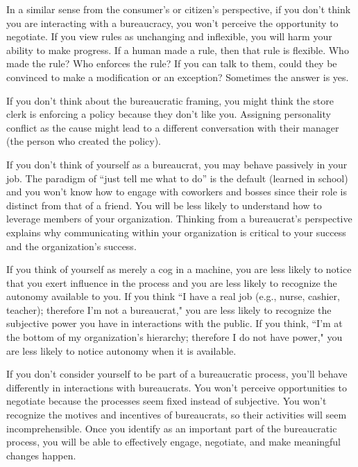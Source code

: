 In a similar sense from the consumer's or citizen's perspective, if you don't think you are interacting with a bureaucracy, you won't perceive the opportunity to negotiate.  If you view rules as unchanging and inflexible, you will harm your ability to make progress. If a human made a rule, then that rule is flexible. Who made the rule? Who enforces the rule? If you can talk to them, could they be convinced to make a modification or an exception? Sometimes the answer is yes.

If you don't think about the bureaucratic framing, you might think the store clerk is enforcing a policy because they don't like you. Assigning personality conflict as the cause might lead to a different conversation with their manager (the person who created the policy). 

If you don't think of yourself as a bureaucrat, you may behave passively in your job. The paradigm of ``just tell me what to do'' is the default (learned in school) and you won't know how to engage with coworkers and bosses since their role is distinct from that of a friend. You will be less likely to understand how to leverage members of your organization. Thinking from a bureaucrat's perspective explains why communicating within your organization is critical to your success and the organization's success. 

If you think of yourself as merely a cog in a machine, you are less likely to notice that you exert influence in the process and you are less likely to recognize the autonomy available to you. 
If you think ``I have a real job (e.g., nurse, cashier, teacher); therefore I'm not a bureaucrat," you are less likely to recognize the subjective power you have in interactions with the public.
If you think, ``I'm at the bottom of my organization's hierarchy; therefore I do not have power," you are less likely to notice autonomy when it is available.

If you don't consider yourself to be part of a bureaucratic process, you'll behave differently in interactions with bureaucrats.  You won't perceive opportunities to negotiate because the processes seem fixed instead of subjective. 
You won't recognize the motives and incentives of bureaucrats, so their activities will seem incomprehensible. Once you identify as an important part of the bureaucratic process, you will be able to effectively engage, negotiate, and make meaningful changes happen.


